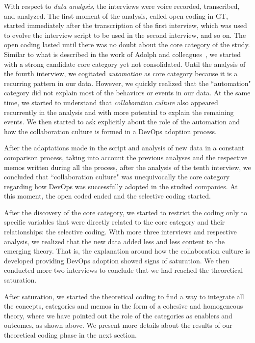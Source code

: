 With respect to \emph{data analysis}, the interviews were voice recorded, transcribed, and analyzed. The first moment
of the analysis, called open coding in GT, started immediately after the
transcription of the first interview, which
was used to evolve the interview script to be used in
the second interview, and so on. The open coding lasted until there was no
doubt about the core category of the study. Similar to what is described in
the work of Adolph and colleagues~\cite{adolph2012reconciling}, we started
with a strong candidate core category yet not consolidated. Until
the analysis of the fourth interview, we cogitated \emph{automation} as core
category because it is a recurring pattern in our data. However, we quickly
realized that the ``automation" category did not explain most of the behaviors
or events in our data. At the same time, we started to understand that
\emph{collaboration culture} also appeared recurrently in the analysis and with more
potential to explain the remaining events. We then started to ask explicitly
about the role of the automation and how the collaboration culture is formed
in a DevOps adoption process.

After the adaptations made in the script and analysis of new data in a constant
comparison process, taking into account the previous analyses and the
respective memos written during all the process, after the analysis of the tenth
interview, we concluded that ``collaboration culture" was unequivocally the core
category regarding how DevOps was successfully adopted in the studied companies.
At this moment, the open coded ended and the selective coding started.

After the discovery of the core category, we started to restrict the coding only
to specific variables that were directly related to the core category and their
relationships: the selective coding.
With more three interviews and respective analysis, we realized that
the new data added less and less content to the emerging theory. That is, the
explanation around how the collaboration culture is developed providing
DevOps adoption showed signs of saturation. We then conducted more two
interviews to conclude that we had reached the theoretical saturation.

After saturation, we started the theoretical coding to find a way to integrate
all the concepts, categories and memos in the form of a cohesive and
homogeneous theory, where we have pointed out the role of the categories as
enablers and outcomes, as shown above. We present more details about
the results of our theoretical coding phase in the next section.

